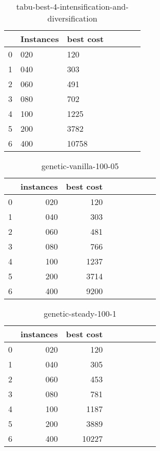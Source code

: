 \begin{table}
    \centering
    \begin{tabular}{lllllll}
        \toprule
        {} & Instances & best cost \\
        \midrule
        0  & 020       & 120       \\
        1  & 040       & 303       \\
        2  & 060       & 491       \\
        3  & 080       & 702       \\
        4  & 100       & 1225      \\
        5  & 200       & 3782      \\
        6  & 400       & 10758     \\
        \bottomrule
    \end{tabular}
    \caption{tabu-best-4-intensification-and-diversification}
    \label{table:tabu-best-4-intensification-and-diversification}
\end{table}

\begin{table}[H]
    \centering
    \begin{tabular}{lrrrrrrrr}
        \toprule
        {} & instances & best cost \\
        \midrule
        0  & 020       & 120       \\
        1  & 040       & 303       \\
        2  & 060       & 481       \\
        3  & 080       & 766       \\
        4  & 100       & 1237      \\
        5  & 200       & 3714      \\
        6  & 400       & 9200      \\
        \bottomrule
    \end{tabular}
    \caption{genetic-vanilla-100-05}
    \label{table:genetic-vanilla-100-05}
\end{table}

\begin{table}[H]
    \centering
    \begin{tabular}{lrrrrrrrr}
        \toprule
        {} & instances & best cost \\
        \midrule
        0  & 020       & 120       \\
        1  & 040       & 305       \\
        2  & 060       & 453       \\
        3  & 080       & 781       \\
        4  & 100       & 1187      \\
        5  & 200       & 3889      \\
        6  & 400       & 10227     \\
        \bottomrule
    \end{tabular}
    \caption{genetic-steady-100-1}
    \label{table:genetic-steady-100-1}
\end{table}
